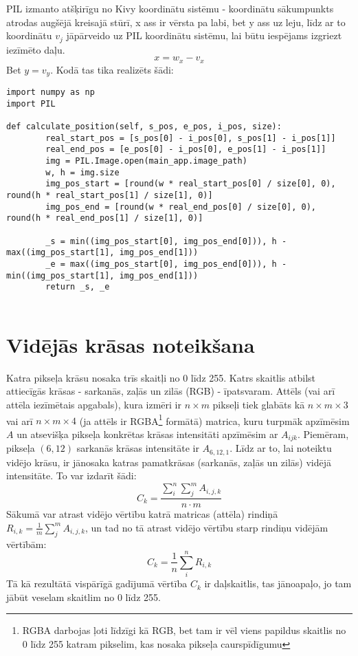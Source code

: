 \documentclass{article}
\begin{document}
PIL izmanto atšķirīgu no Kivy koordinātu sistēmu - koordinātu sākumpunkts atrodas augšējā kreisajā stūrī, x ass ir vērsta pa labi, bet y ass uz leju, līdz ar to koordinātu $v_j$ jāpārveido uz PIL koordinātu sistēmu, lai būtu iespējams izgriezt iezīmēto daļu.
$$
    x = w_x - v_x
$$
Bet $y = v_y$. Kodā tas tika realizēts šādi:

\begin{lstlisting}
import numpy as np
import PIL

def calculate_position(self, s_pos, e_pos, i_pos, size):
        real_start_pos = [s_pos[0] - i_pos[0], s_pos[1] - i_pos[1]]
        real_end_pos = [e_pos[0] - i_pos[0], e_pos[1] - i_pos[1]]
        img = PIL.Image.open(main_app.image_path)
        w, h = img.size
        img_pos_start = [round(w * real_start_pos[0] / size[0], 0), round(h * real_start_pos[1] / size[1], 0)]
        img_pos_end = [round(w * real_end_pos[0] / size[0], 0), round(h * real_end_pos[1] / size[1], 0)]

        _s = min((img_pos_start[0], img_pos_end[0])), h - max((img_pos_start[1], img_pos_end[1]))
        _e = max((img_pos_start[0], img_pos_end[0])), h - min((img_pos_start[1], img_pos_end[1]))
        return _s, _e
    
\end{lstlisting}

\section{Vidējās krāsas noteikšana}

Katra pikseļa krāsu nosaka trīs skaitļi no 0 līdz 255. Katrs skaitlis atbilst attiecīgās krāsas - sarkanās, zaļās un zilās (RGB) - īpatsvaram. Attēls (vai arī attēla iezīmētais apgabals), kura izmēri ir $n\times m$ pikseļi tiek glabāts kā $n\times m \times 3$ vai arī $n \times m \times 4$ (ja attēls ir RGBA\footnote{RGBA darbojas ļoti līdzīgi kā RGB, bet tam ir vēl viens papildus skaitlis no 0 līdz 255 katram pikselim, kas nosaka pikseļa caurspīdīgumu} formātā) matrica, kuru turpmāk apzīmēsim $A$ un atsevišķa pikseļa konkrētas krāsas intensitāti apzīmēsim ar $A_{ijk}$. Piemēram, pikseļa $(6, 12)$ sarkanās krāsas intensitāte ir $A_{6,12,1}$. Līdz ar to, lai noteiktu vidējo krāsu, ir jānosaka katras pamatkrāsas (sarkanās, zaļās un zilās) vidējā intensitāte. To var izdarīt šādi:
$$
    C_{k} = \frac{\sum_i^n \sum_j^m A_{i,j,k}}{n\cdot m}
$$
Sākumā var atrast vidējo vērtību katrā matricas (attēla) rindiņā $ R_{i,k} = \frac{1}{m}\sum_j^m A_{i,j,k}$, un tad no tā atrast vidējo vērtību starp rindiņu vidējām vērtībām:
$$
    C_{k} = \frac{1}{n}\sum_i^n R_{i,k}
$$
Tā kā rezultātā vispārīgā gadījumā vērtība $C_{k}$ ir daļskaitlis, tas jānoapaļo, jo tam jābūt veselam skaitlim no 0 līdz 255.
\end{document}
